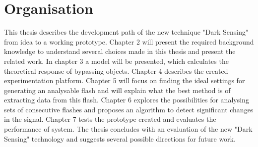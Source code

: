 \section{Organisation}
This thesis describes the development path of the new technique "Dark Sensing" from idea to a working prototype. Chapter 2 will present the required background knowledge to understand several choices made in this thesis and present the related work. In chapter 3 a model will be presented, which calculates the theoretical response of bypassing objects. Chapter 4 describes the created experimentation platform. Chapter 5 will focus on finding the ideal settings for generating an analysable flash and will explain what the best method is of extracting data from this flash. Chapter 6 explores the possibilities for analysing sets of consecutive flashes and proposes an algorithm to detect significant changes in the signal. Chapter 7 tests the prototype created and evaluates the performance of system. The thesis concludes with an evaluation of the new "Dark Sensing" technology and suggests several possible directions for future work.